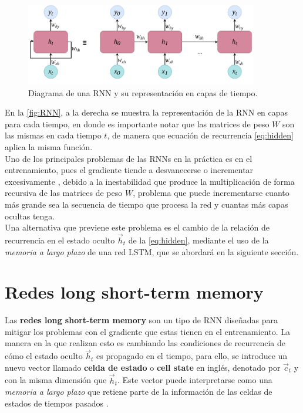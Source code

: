 \begin{figure}[!htbp]
  \centering
  \includegraphics[width=0.9\textwidth]{./img/RNN.png}
  \caption{Diagrama de una \acs{RNN} y su representación en capas de tiempo.}
  \label{fig:RNN}
\end{figure}

En la \autoref{fig:RNN}, a la derecha se muestra la representación de la \acs{RNN} en capas para cada tiempo, en donde es importante notar que las matrices de peso $W$ son las mismas en cada tiempo $t$, de manera que ecuación de recurrencia \autoref{eq:hidden} aplica la misma función.
\\

Uno de los principales problemas de las \acs{RNN}s en la práctica es en el entrenamiento, pues el gradiente tiende a desvanecerse o incrementar excesivamente \cite{pmlr-v9-glorot10a, Pascanu2012UnderstandingTE}, debido a la inestabilidad que produce la multiplicación de forma recursiva de las matrices de peso $W$, problema que puede incrementarse cuanto más grande sea la secuencia de tiempo que procesa la red y cuantas más capas ocultas tenga.
\\
Una alternativa que previene este problema es el cambio de la relación de recurrencia en el estado oculto $\vec{h}_t$ de la \autoref{eq:hidden}, mediante el uso de la \emph{memoria a largo plazo} de una red \acs{LSTM}, que se abordará en la siguiente sección.

\section{Redes long short-term memory}\label{sec:lstm}

Las \textbf{redes long short-term memory} \cite{Hochreiter1997} son un tipo de \acs{RNN} diseñadas para mitigar los problemas con el gradiente que estas tienen en el entrenamiento. La manera en la que realizan esto es cambiando las condiciones de recurrencia de cómo el estado oculto $\vec{h}_t$ es propagado en el tiempo, para ello, se introduce un nuevo vector llamado \textbf{celda de estado} o \textbf{cell state} en inglés, denotado por $\vec{c}_{t}$ y con la misma dimensión que $\vec{h}_t$. Este vector puede interpretarse como una \emph{memoria a largo plazo} que retiene parte de la información de las celdas de estados de tiempos pasados \cite{Nielsen:2018}.

